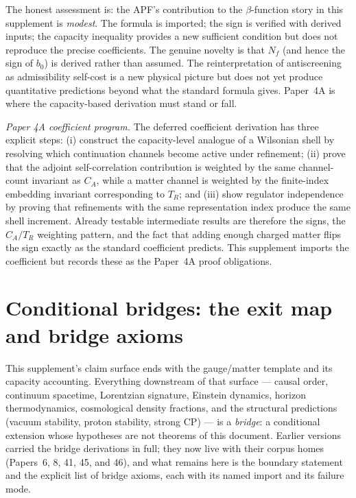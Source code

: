 \documentclass[11pt]{article}
\theoremstyle{definition}
\begin{document}
\smallskip\noindent The honest assessment is: the APF's
contribution to the $\beta$-function story in this supplement is
\emph{modest}.  The formula is imported; the sign is verified with
derived inputs; the capacity inequality provides a new sufficient
condition but does not reproduce the precise coefficients.  The
genuine novelty is that $N_f$ (and hence the sign of $b_0$) is
derived rather than assumed.  The reinterpretation of antiscreening
as admissibility self-cost is a new physical picture but does not yet
produce quantitative predictions beyond what the standard formula
gives.  Paper~4A is where the capacity-based derivation must stand
or fall.


\newpage



\noindent\textit{Paper 4A coefficient program.}\quad
The deferred coefficient derivation has three explicit steps: (i) construct
the capacity-level analogue of a Wilsonian shell by resolving which
continuation channels become active under refinement; (ii) prove that the
adjoint self-correlation contribution is weighted by the same channel-count
invariant as $C_A$, while a matter channel is weighted by the finite-index
embedding invariant corresponding to $T_R$; and (iii) show regulator
independence by proving that refinements with the same representation index
produce the same shell increment.  Already testable intermediate results are
therefore the signs, the $C_A/T_R$ weighting pattern, and the fact that
adding enough charged matter flips the sign exactly as the standard
coefficient predicts.  This supplement imports the coefficient but records
these as the Paper~4A proof obligations.


\section{Conditional bridges: the exit map and bridge axioms}
\label{sec:bridge_axioms}

This supplement's claim surface ends with the gauge/matter template and its
capacity accounting.  Everything downstream of that surface --- causal order,
continuum spacetime, Lorentzian signature, Einstein dynamics, horizon
thermodynamics, cosmological density fractions, and the structural
predictions (vacuum stability, proton stability, strong CP) --- is a
\emph{bridge}: a conditional extension whose hypotheses are not theorems of
this document.  Earlier versions carried the bridge derivations in full;
they now live with their corpus homes (Papers~6, 8, 41, 45, and 46), and
what remains here is the boundary statement and the explicit list of bridge
axioms, each with its named import and its failure mode.
\end{document}
